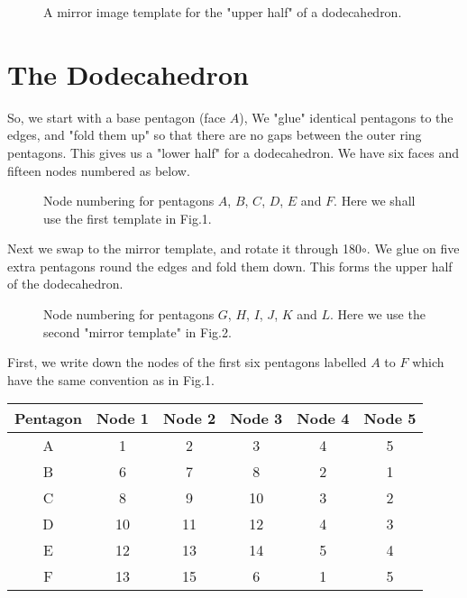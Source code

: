 \documentclass[12pt]{article}
\begin{document}
\vspace*{10cm}
\begin{figure}[htb]
\caption{ A mirror image template for the "upper half" of a dodecahedron.
}
\end{figure}

\section{The Dodecahedron}

So, we start with a base pentagon (face $A$), We "glue" identical pentagons
to the edges, and "fold them up" so that there are no gaps between the outer ring 
pentagons. This gives us a "lower half" for a dodecahedron. We have six faces
and fifteen nodes numbered as below.

\vspace*{10cm}
\begin{figure}[htb]
\caption{ 
Node numbering for pentagons $A$, $B$, $C$, $D$, $E$ and $F$. Here we shall use
the first template in Fig.1.
}
\end{figure}

Next we swap to the mirror template, and rotate it through 180$\circ$. We glue
on five extra pentagons round the edges and fold them down. This forms the 
upper half of the dodecahedron.

\vspace*{15cm}
\begin{figure}[htb]
\caption{ 
Node numbering for pentagons $G$, $H$, $I$, $J$, $K$ and $L$. Here we use
the second "mirror template" in Fig.2.
}
\end{figure}

First, we write down the nodes of the first six pentagons labelled $A$ to $F$
which have the same convention as in Fig.1.
\begin{center}
\begin{tabular}{| c | c | c | c | c | c |}
\hline
Pentagon &  Node 1 & Node 2 & Node 3 & Node 4 & Node 5 \\
\hline
A & 1 & 2 & 3 & 4 & 5 \\
B & 6 & 7 & 8 & 2 & 1 \\
C &  8 & 9 & 10 & 3 & 2 \\
D & 10 & 11 & 12 & 4 & 3 \\
E & 12 & 13 & 14 & 5 & 4 \\
F & 13 & 15 & 6 & 1 & 5 \\
\hline
\end{tabular}
\end{center}
\end{document}
